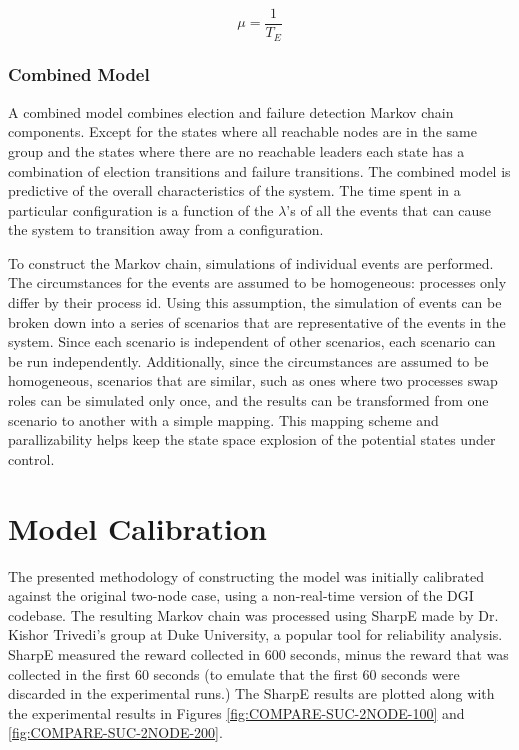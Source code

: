 \begin{equation}
\mu = \frac{1}{T_{E}}
\end{equation}

\subsubsection{Combined Model}

A combined model combines election and failure detection Markov chain components. Except for the
states where all reachable nodes are in the same group and the states where there are no reachable
leaders each state has a combination of election transitions and failure transitions.                                                        
The combined model is predictive of the overall characteristics of the system. The
time spent in a particular configuration is a function of the $\lambda$'s of all the
events that can cause the system to transition away from a configuration. 

To construct the Markov chain, simulations of individual events are performed. The circumstances
for the events are assumed to be homogeneous: processes only differ by their process id.
Using this assumption, the simulation of events can be broken down into a series of scenarios
that are representative of the events in the system. Since each scenario is independent of other
scenarios, each scenario can be run independently.  Additionally, since the circumstances
are assumed to be homogeneous, scenarios that are similar, such as ones where two processes
swap roles can be simulated only once, and the results can be transformed from one scenario
to another with a simple mapping. This mapping scheme and parallizability helps keep the
state space explosion of the potential states under control.

\section{Model Calibration}

The presented methodology of constructing the model was initially calibrated against the
original two-node case, using a non-real-time version of the DGI codebase. The resulting
Markov chain was processed using SharpE \cite{SHARPE}\cite{SHARPE2} made by Dr. Kishor
Trivedi's group at Duke University, a popular tool for reliability analysis. SharpE measured the reward collected in 600 seconds,
minus the reward that was collected in the first 60 seconds (to emulate that the first
60 seconds were discarded in the experimental runs.) The SharpE results are plotted along
with the experimental results in Figures \ref{fig:COMPARE-SUC-2NODE-100} and \ref{fig:COMPARE-SUC-2NODE-200}.

